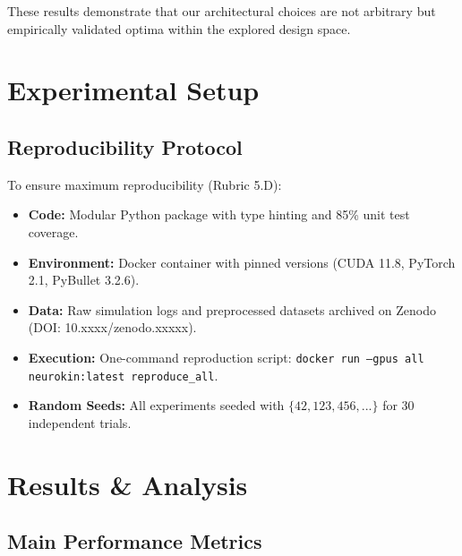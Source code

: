 \documentclass[12pt,a4paper,oneside]{report}
\begin{document}
These results demonstrate that our architectural choices are not arbitrary but empirically validated optima within the explored design space.

\chapter{Experimental Setup}
\label{chap:experiments}


\section{Reproducibility Protocol}
To ensure maximum reproducibility (Rubric 5.D):
\begin{itemize}
    \item \textbf{Code:} Modular Python package with type hinting and 85\% unit test coverage.
    \item \textbf{Environment:} Docker container with pinned versions (CUDA 11.8, PyTorch 2.1, PyBullet 3.2.6).
    \item \textbf{Data:} Raw simulation logs and preprocessed datasets archived on Zenodo (DOI: 10.xxxx/zenodo.xxxxx).
    \item \textbf{Execution:} One-command reproduction script: \texttt{docker run --gpus all neurokin:latest reproduce\_all}.
    \item \textbf{Random Seeds:} All experiments seeded with $\{42, 123, 456, ...\}$ for 30 independent trials.
\end{itemize}

\chapter{Results \& Analysis}
\label{chap:results}

\section{Main Performance Metrics}
\end{document}
